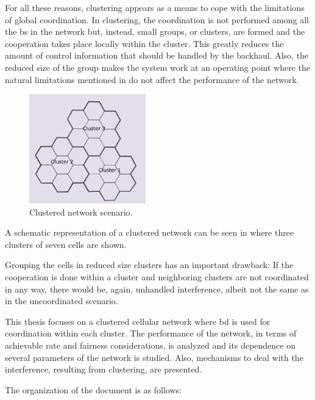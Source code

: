 For all these reasons, clustering appears as a means to cope with the
limitations of global coordination. In clustering, the coordination is not
performed among all the \gls{bs} in the network but, instead, small groups, or
clusters, are formed and the cooperation takes place locally within the cluster.
This greatly reduces the amount of control information that should be handled by
the backhaul. Also, the reduced size of the group makes the system work at an
operating point where the natural limitations mentioned in \cite{lozano13} do
not affect the performance of the network.

\begin{figure}[t]
    \centering
    \includegraphics[width=0.45\textwidth]{./01.introduction/img/clustered_network.png}
    \caption{Clustered network scenario.}
    \label{fig:clustered_network}
\end{figure}

A schematic representation of a clustered network can be seen in
 where three clusters of seven cells are shown.

Grouping the cells in reduced size clusters has an important drawback: If the
cooperation is done within a cluster and neighboring clusters are not
coordinated in any way, there would be, again, unhandled interference, albeit
not the same as in the uncoordinated scenario.

This thesis focuses on a clustered cellular network where \gls{bd} is used for
coordination within each cluster. The performance of the network, in terms of
achievable rate and fairness considerations, is analyzed and its dependence on
several parameters of the network is studied. Also, mechanisms to deal with the
interference, resulting from clustering, are presented.

The organization of the document is as follows:

